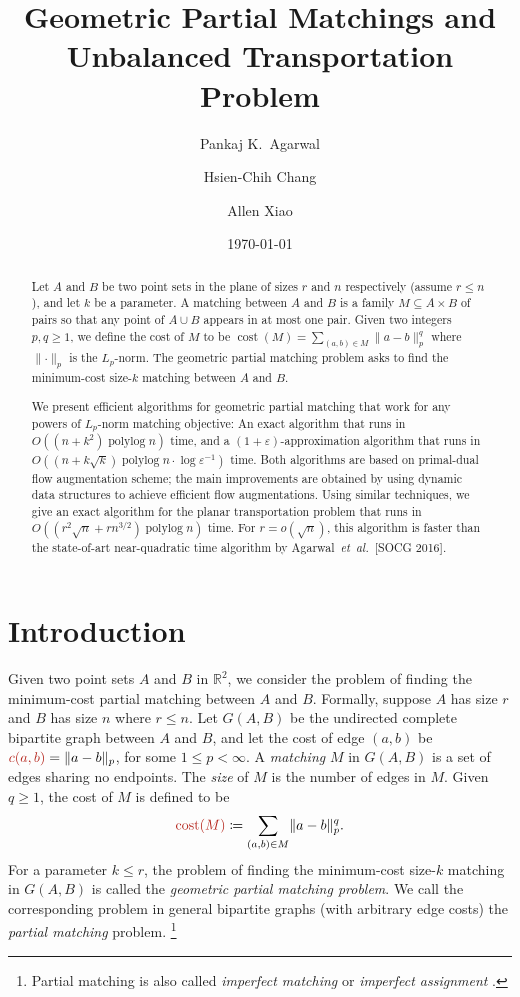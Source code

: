 \documentclass[a4paper,UKenglish]{socg-lipics-v2018}
\title{Geometric Partial Matchings and Unbalanced Transportation Problem}
\author{Pankaj K.\ Agarwal}{Duke University, USA}{pankaj@cs.duke.edu}{}{}
\author{Hsien-Chih Chang}{Duke University, USA}{hsienchih.chang@duke.edu}{}{}
\author{Allen Xiao}{Duke University, USA}{axiao@cs.duke.edu}{}{}
\date{\today}
\def\etal{\emph{et~al.}}
\def\etal{\textit{et~al.}}
\def\polylog{\mathop{\mathrm{polylog}}}
\def\eps{\varepsilon}
\def\reals{\mathbb{R}}
\def\norm#1{\mathopen\| #1 \mathclose\|}	%
\def\cost{\operatorname{cost}}
\theoremstyle{plain}
\numberwithin{figure}{section}
\def\EMPH#1{\textcolor{BrickRed}{{\emph{#1}}}}
\begin{document}
\maketitle

\begin{abstract}
Let $A$ and $B$ be two point sets in the plane of sizes $r$ and $n$ respectively (assume $r \leq n$), and let $k$ be a parameter.
A matching between $A$ and $B$ is a family $M \subseteq A \times B$ of pairs so that any point of $A \cup B$ appears in at most one pair.
Given two integers $p, q \geq 1$, we define the cost of $M$ to be $\cost(M) = \sum_{(a, b) \in M}\norm{a-b}_p^q$ where $\norm{\cdot}_p$ is the $L_p$-norm.
The geometric partial matching problem asks to find the minimum-cost size-$k$ matching between $A$ and $B$.

We present efficient algorithms for geometric partial matching that work for any powers of $L_p$-norm matching objective:
An exact algorithm that runs in $O((n + k^2)\polylog n)$ time, and a $(1 + \eps)$-approximation algorithm that runs in $O((n + k\sqrt{k})\polylog n \cdot \log\eps^{-1})$ time.
Both algorithms are based on primal-dual flow augmentation scheme; the main improvements are obtained by using dynamic data structures to achieve efficient flow augmentations.
Using similar techniques, we give an exact algorithm for the planar transportation problem that runs in $O((r^2\sqrt{n} + rn^{3/2})\polylog n)$ time.
For $r = o(\sqrt{n})$, this algorithm is faster than the state-of-art near-quadratic time algorithm by Agarwal~\etal\ [SOCG 2016].
\end{abstract}


\section{Introduction}

Given two point sets $A$ and $B$ in $\reals^2$, we consider the problem of finding
the minimum-cost partial matching between $A$ and $B$.
Formally, suppose $A$ has size $r$ and $B$ has size $n$ where $r \leq n$.
Let $G(A, B)$ be the undirected complete bipartite graph between
$A$ and $B$, and let the cost of edge $(a, b)$ be
$\EMPH{$c(a, b)$} = \norm{a-b}_p$, for some $1 \leq p < \infty$.
A \EMPH{matching} $M$ in $G(A, B)$ is a set of edges sharing no endpoints.
The \EMPH{size} of $M$ is the number of edges in $M$.
Given $q \geq 1$, the cost of $M$ is defined to be
\begin{equation*}
	\EMPH{$\cost(M)$} \coloneqq \sum_{(a, b) \in M} \norm{a-b}_p^q.
\end{equation*}
For a parameter $k \leq r$, the problem of finding the minimum-cost
size-$k$ matching in $G(A, B)$ is called the \EMPH{geometric partial matching problem}.
We call the corresponding problem in general bipartite graphs (with arbitrary
edge costs) the \EMPH{partial matching} problem.%
\footnote{Partial matching is also called \EMPH{imperfect matching} or \EMPH{imperfect assignment} \cite{RT12,GHKT17}.}
\end{document}
